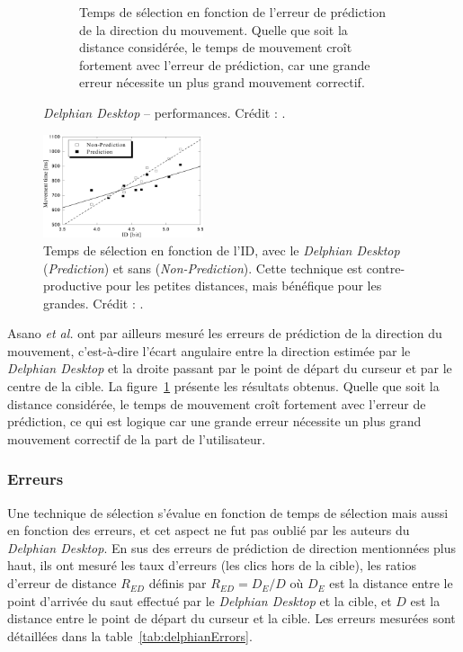 \begin{appendices}
\begin{figure}[htbp]
\begin{subfigure}[t]{0.49\textwidth}
			\caption{Temps de sélection en fonction de l'erreur de prédiction de la direction du mouvement. Quelle que soit la distance considérée, le temps de mouvement croît fortement avec l'erreur de prédiction, car une grande erreur nécessite un plus grand mouvement correctif.}
			\label{fig:delphianTimesErrors}
		\end{subfigure}
		\caption[\emph{Delphian Desktop} -- performances]{\emph{Delphian Desktop} -- performances. Crédit : \cite{asano2005predictive}.}
		\label{fig:delphianPerf}
	\end{figure}


	\begin{figure}
		\centering
		\includegraphics[width=0.42\textwidth]{figures/ch2/delphianTimesID}
		\caption[\emph{Delphian Desktop} -- temps de sélection en fonction de l'ID]{Temps de sélection en fonction de l'ID, avec le \emph{Delphian Desktop} (\emph{Prediction}) et sans (\emph{Non-Prediction}). Cette technique est contre-productive pour les petites distances, mais bénéfique pour les grandes. Crédit : \cite{asano2005predictive}.}
		\label{fig:delphianTimesID}
	\end{figure}
	
	Asano \emph{et al.} ont par ailleurs mesuré les erreurs de prédiction de la direction du mouvement, c'est-à-dire l'écart angulaire entre la direction estimée par le \emph{Delphian Desktop} et la droite passant par le point de départ du curseur et par le centre de la cible. La figure~\ref{fig:delphianTimesErrors} présente les résultats obtenus. Quelle que soit la distance considérée, le temps de mouvement croît fortement avec l'erreur de prédiction, ce qui est logique car une grande erreur nécessite un plus grand mouvement correctif de la part de l'utilisateur.
	
	\subsubsection{Erreurs}
	Une technique de sélection s'évalue en fonction de temps de sélection mais aussi en fonction des erreurs, et cet aspect ne fut pas oublié par les auteurs du \emph{Delphian Desktop}. En sus des erreurs de prédiction de direction mentionnées plus haut, ils ont mesuré les taux d'erreurs (les clics hors de la cible), les ratios d'erreur de distance $R_{ED}$ définis par $R_{ED} = D_{E}/D$ où $D_{E}$ est la distance entre le point d'arrivée du \og saut \fg{} effectué par le \emph{Delphian Desktop} et la cible, et $D$ est la distance entre le point de départ du curseur et la cible. Les erreurs mesurées sont détaillées dans la table~\ref{tab:delphianErrors}.
	

\end{appendices}
